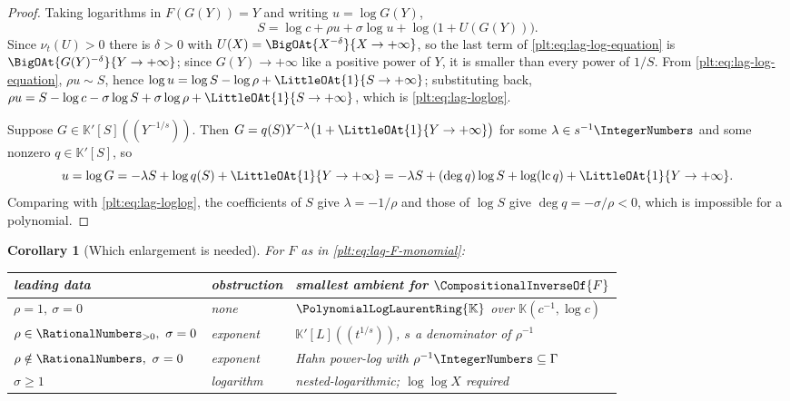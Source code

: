 \documentclass[11pt,oneside]{article}
\theoremstyle{plain}
\newtheorem{corollary}[theorem]{Corollary}
\theoremstyle{definition}
\theoremstyle{remark}
\newcommand{\K}{\mathbb{K}}
\newcommand{\PLlau}{\PolynomialLogLaurentRing{\K}}       %
\newcommand{\ordt}{\nu_{t}}                              %
\newcommand{\rev}[1]{\CompositionalInverseOf{#1}}
\begin{document}
\begin{proof}
Taking logarithms in \(F(G(Y))=Y\) and writing \(u=\log G(Y)\),
\begin{equation}
\label{plt:eq:lag-log-equation}
  S=\log c+\rho u+\sigma\log u+\log\bigl(1+U(G(Y))\bigr).
\end{equation}
Since \(\ordt(U)>0\) there is \(\delta>0\) with
\(U(X)=\BigOAt{X^{-\delta}}{X\to+\infty}\), so the last term of
\cref{plt:eq:lag-log-equation} is
\(\BigOAt{G(Y)^{-\delta}}{Y\to+\infty}\); since \(G(Y)\to+\infty\) like a
positive power of \(Y\), it is smaller than every power of \(1/S\).  From
\cref{plt:eq:lag-log-equation}, \(\rho u\sim S\), hence
\(\log u=\log S-\log\rho+\LittleOAt{1}{S\to+\infty}\); substituting back,
\(\rho u=S-\log c-\sigma\log S+\sigma\log\rho+\LittleOAt{1}{S\to+\infty}\),
which is \cref{plt:eq:lag-loglog}.

Suppose \(G\in\K'[S]((Y^{-1/s}))\).  Then
\(G=q(S)Y^{-\lambda}\bigl(1+\LittleOAt{1}{Y\to+\infty}\bigr)\) for some
\(\lambda\in s^{-1}\IntegerNumbers\) and some nonzero \(q\in\K'[S]\), so
\[
  u=\log G=-\lambda S+\log q(S)+\LittleOAt{1}{Y\to+\infty}
   =-\lambda S+(\deg q)\log S+\log(\mathrm{lc}\,q)
    +\LittleOAt{1}{Y\to+\infty}.
\]
Comparing with \cref{plt:eq:lag-loglog}, the coefficients of \(S\) give
\(\lambda=-1/\rho\) and those of \(\log S\) give \(\deg q=-\sigma/\rho<0\),
which is impossible for a polynomial.
\end{proof}

\begin{corollary}[Which enlargement is needed]
\label{plt:cor:lag-enlargement}
For \(F\) as in \cref{plt:eq:lag-F-monomial}:
\begin{center}
\begin{tabular}{@{}lll@{}}
\hline
leading data & obstruction & smallest ambient for \(\rev{F}\)\\
\hline
\(\rho=1,\ \sigma=0\) & none & \(\PLlau\) over \(\K(c^{-1},\log c)\)\\
\(\rho\in\RationalNumbers_{>0},\ \sigma=0\) & exponent &
   \(\K'[L]((t^{1/s}))\), \(s\) a denominator of \(\rho^{-1}\)\\
\(\rho\notin\RationalNumbers,\ \sigma=0\) & exponent &
   Hahn power-log with \(\rho^{-1}\IntegerNumbers\subseteq\Gamma\)\\
\(\sigma\ge1\) & logarithm & nested-logarithmic; \(\log\log X\) required\\
\hline
\end{tabular}
\end{center}
\end{corollary}
\end{document}
